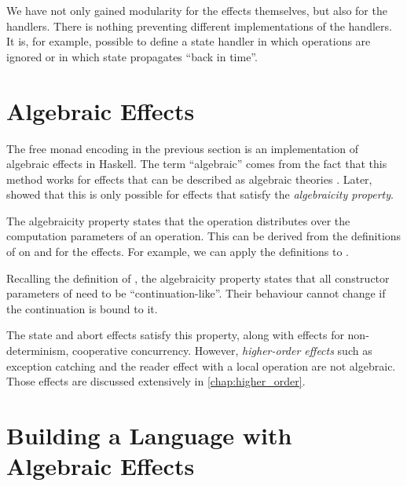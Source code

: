 We have not only gained modularity for the effects themselves, but also for the handlers. There is nothing preventing different implementations of the handlers. It is, for example, possible to define a state handler in which  operations are ignored or in which state propagates ``back in time''.

\section{Algebraic Effects}

The free monad encoding in the previous section is an implementation of algebraic effects in Haskell. The term ``algebraic'' comes from the fact that this method works for effects that can be described as algebraic theories \autocite{goos_adequacy_2001}. Later, \textcite{plotkin_algebraic_2003} showed that this is only possible for effects that satisfy the \emph{algebraicity property}.

The algebraicity property states that the \hs{>>=} operation distributes over the computation parameters of an operation. This can be derived from the definitions of \hs{>>=} on  and  for the effects. For example, we can apply the definitions to .


Recalling the definition of , the algebraicity property states that all constructor parameters of  need to be ``continuation-like''. Their behaviour cannot change if the continuation is bound to it.

The state and abort effects satisfy this property, along with effects for non-determinism, cooperative concurrency. However, \emph{higher-order effects} such as exception catching and the reader effect with a local operation are not algebraic. Those effects are discussed extensively in \cref{chap:higher_order}.

\section{Building a Language with Algebraic Effects}

